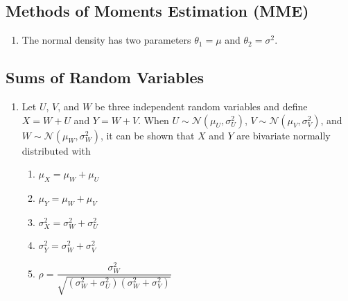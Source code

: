 \subsection{Methods of Moments Estimation (MME)}

\begin{enumerate}
    \item The normal density has two parameters $\theta_1 = \mu$ and $\theta_2 = \sigma^ 2$.
    \hfill \cite{statistics/book/Statistics-for-Data-Scientists/Maurits-Kaptein}


\end{enumerate}


\subsection{Sums of Random Variables}

\begin{enumerate}
    \item Let $U$, $V$, and $W$ be three independent random variables and define $X = W + U$ and $Y = W + V$.
    When $U \sim \mathcal{N} (\mu_U , \sigma^2_U )$, $V \sim \mathcal{N} (\mu_V , \sigma^2_V )$, and $W \sim \mathcal{N} (\mu_W , \sigma^2_W )$, it can be shown that $X$ and $Y$ are bivariate normally distributed with
    \hfill \cite{statistics/book/Statistics-for-Data-Scientists/Maurits-Kaptein}
    \begin{multicols}{2}
    \begin{enumerate}
        \item $\mu _X = \mu _W + \mu _U$
        \hfill \cite{statistics/book/Statistics-for-Data-Scientists/Maurits-Kaptein}

        \item $\mu _Y = \mu _W + \mu _V$
        \hfill \cite{statistics/book/Statistics-for-Data-Scientists/Maurits-Kaptein}

        \item $\sigma ^2_X = \sigma ^2_W + \sigma ^2_U$
        \hfill \cite{statistics/book/Statistics-for-Data-Scientists/Maurits-Kaptein}

        \item $\sigma ^2_Y = \sigma ^2_W + \sigma ^2_V$
        \hfill \cite{statistics/book/Statistics-for-Data-Scientists/Maurits-Kaptein}

        \item $\rho = \dfrac{\sigma ^2_W }{\sqrt{(\sigma ^2_W + \sigma ^2_U )(\sigma ^2_W + \sigma ^2_V )}}$
        \hfill \cite{statistics/book/Statistics-for-Data-Scientists/Maurits-Kaptein}
    \end{enumerate}
    \end{multicols}
\end{enumerate}



